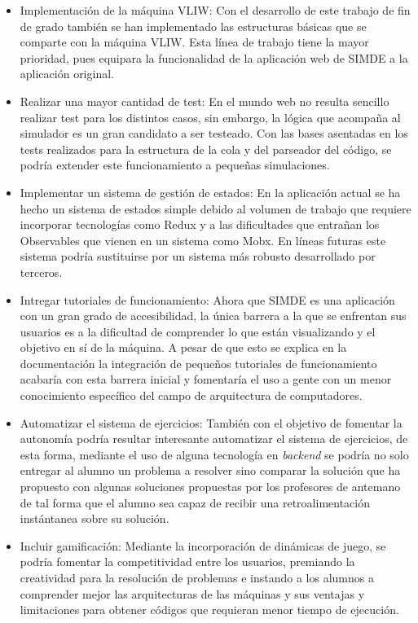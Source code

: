 \begin{itemize}

\item Implementación de la máquina VLIW: Con el desarrollo de este trabajo de fin de grado también se han implementado las estructuras básicas que se comparte con la máquina 
VLIW. Esta línea de trabajo tiene la mayor prioridad, pues equipara la funcionalidad de la aplicación web de 
SIMDE a la aplicación original.

\item Realizar una mayor cantidad de test: En el mundo web no resulta sencillo realizar test 
para los distintos casos, sin embargo, la lógica que acompaña al simulador es un gran candidato a 
ser testeado. Con las bases asentadas en los tests realizados para la estructura de la cola y 
del parseador del código, se podría extender este funcionamiento a pequeñas simulaciones.

\item Implementar un sistema de gestión de estados: En la aplicación actual se ha hecho un sistema
de estados simple debido al volumen de trabajo que requiere incorporar tecnologías
como Redux y a las dificultades que entrañan los Observables que vienen 
en un sistema como Mobx. En líneas futuras este sistema podría sustituirse por un 
sistema más robusto desarrollado por terceros.

\item Intregar tutoriales de funcionamiento: Ahora que SIMDE es una aplicación con un gran
grado de accesibilidad, la única barrera a la que se enfrentan sus usuarios es a la dificultad de
comprender lo que están visualizando y el objetivo en sí de la máquina. A pesar de que esto
se explica en la documentación la integración de pequeños tutoriales de funcionamiento acabaría con 
esta barrera inicial y fomentaría el uso a gente con un menor conocimiento específico del campo
de arquitectura de computadores.

\item Automatizar el sistema de ejercicios: También con el objetivo de fomentar la autonomía podría
resultar interesante automatizar el sistema de ejercicios, de esta forma, mediante el uso de alguna
tecnología en \textit{backend} se podría no solo entregar al alumno un problema a resolver sino 
comparar la solución que ha propuesto con algunas soluciones propuestas por los profesores de antemano
de tal forma que el alumno sea capaz de recibir una retroalimentación instántanea sobre su solución.

\item Incluir gamificación: Mediante la incorporación de dinámicas de juego, se podría fomentar la
competitividad entre los usuarios, premiando la creatividad para la resolución de problemas e instando
a los alumnos a comprender mejor las arquitecturas de las máquinas y sus ventajas y limitaciones para
obtener códigos que requieran menor tiempo de ejecución.


\end{itemize}
